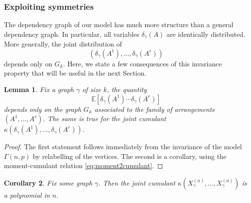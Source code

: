 \documentclass[12pt,a4paper,reqno]{amsart}
\newtheorem{lemma}{Lemma}[section]
\newtheorem{corollary}[lemma]{Corollary}
\theoremstyle{remark}
\renewcommand{\AA}{\mathbb{A}}
\newcommand{\esper}{\mathbb{E}}
\newcommand{\SubGraph}{X^{(n)}}
\begin{document}
\subsubsection{Exploiting symmetries}
The dependency graph of our model has much more structure than a general dependency graph. In particular, all variables $\delta_\gamma(A)$ are identically distributed. More generally, the joint distribution of
\[ \left( \delta_\gamma(A^1),\dots,\delta_\gamma(A^r) \right) \]
depends only on $G_\AA$. Here, we state a few consequences of this invariance property that will be useful
in the next Section.

\begin{lemma}\label{lem:indjointmoments}
Fix a graph $\gamma$ of size $k$, the quantity
$$\esper\!\left[ \delta_{\gamma}(A^1) \cdots \delta_{\gamma}(A^r) \right]$$
depends only on the graph $G_\AA$ associated to the family of arrangements $(A^1,\dots,A^r)$. The same is true for the joint cumulant $\kappa\left( \delta_{\gamma}(A^1), \dots, \delta_{\gamma}(A^r) \right).$
\end{lemma}

\begin{proof}
The first statement follows immediately  from the invariance of the model $\Gamma(n,p)$ by relabelling of the vertices. The second is a corollary, using the moment-cumulant relation \eqref{eq:moment2cumulant}.
\end{proof}
\medskip 

\begin{corollary}
Fix some graph $\gamma$.
Then the joint cumulant $\kappa(\SubGraph_{\gamma},\dots,\SubGraph_{\gamma})$ is a polynomial in $n$.
\label{cor:jointcumulantpoly}
\end{corollary}
\end{document}
